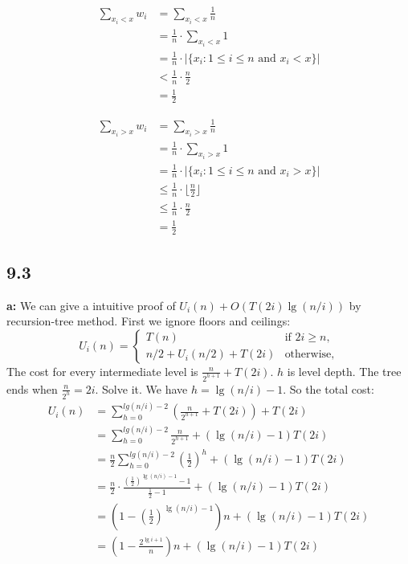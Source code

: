 \documentclass{book}
\begin{document}
\begin{CJK}{UTF8}{gkai}
\begin{align*}
\sum_{x_i < x} w_i & = \sum_{x_i < x} \frac{1}{n} \\
& = \frac{1}{n}\cdot \sum_{x_i < x} 1 \\
& = \frac{1}{n}\cdot |\{x_i: 1 \le i \le n \text{ and } x_i < x\}| \\
& < \frac{1}{n} \cdot \frac{n}{2} \\
& = \frac{1}{2}
\end{align*}

\begin{align*}
\sum_{x_i > x} w_i & = \sum_{x_i > x} \frac{1}{n} \\
& = \frac{1}{n} \cdot \sum_{x_i > x} 1 \\
& = \frac{1}{n} \cdot |\{x_i: 1\le i \le n \text{ and } x_i > x\}| \\
& \le \frac{1}{n}\cdot\lfloor\frac{n}{2}\rfloor \\
& \le \frac{1}{n}\cdot \frac{n}{2} \\
& = \frac{1}{2}
\end{align*}

\subsection*{9.3}
\textbf{a:} We can give a intuitive proof of $U_i(n)+O(T(2i)\lg(n/i))$ by 
recursion-tree method. First we ignore floors and ceilings:
\begin{equation*}
U_i(n) = \left\{\begin{array}{lr}
T(n) & \text{if }2i \ge n, \\
n/2 + U_i(n/2) + T(2i) & \text{otherwise},
\end{array} \right.
\end{equation*}
The cost for every intermediate level is $\frac{n}{2^{h+1}}+T(2i)$. $h$ is level 
depth. The tree ends when $\frac{n}{2^h}=2i$. Solve it. We have $h=\lg(n/i)-1$.  
So the total cost:
\begin{align*}
U_i(n) & = \sum_{h=0}^{lg(n/i)-2}(\frac{n}{2^{h+1}}+T(2i))+T(2i) \\
& = \sum_{h=0}^{lg(n/i)-2}\frac{n}{2^{h+1}}+(\lg(n/i)-1)T(2i) \\
& = \frac{n}{2}\sum_{h=0}^{lg(n/i)-2}(\frac{1}{2})^h+(\lg(n/i)-1)T(2i) \\
& = 
\frac{n}{2}\cdot\frac{(\frac{1}{2})^{\lg(n/i)-1}-1}{\frac{1}{2}-1}+(\lg(n/i)-1)T(2i) 
\\
& = (1-(\frac{1}{2})^{\lg(n/i)-1})n + (\lg(n/i)-1)T(2i) \\
& = (1-\frac{2^{\lg i + 1}}{n})n + (\lg(n/i)-1)T(2i)
\end{align*}


\end{CJK}
\end{document}
